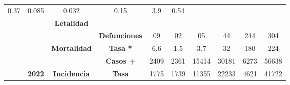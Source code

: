 \begin{tabular}{lccc|cccccc|}
		\multicolumn{1}{c|}{\cellcolor[HTML]{E2EFDA}0.37} &
		\multicolumn{1}{c|}{\cellcolor[HTML]{E2EFDA}0.085} &
		\multicolumn{1}{c|}{\cellcolor[HTML]{E2EFDA}0.032} &
		\multicolumn{1}{c|}{\cellcolor[HTML]{E2EFDA}0.15} &
		\multicolumn{1}{c|}{\cellcolor[HTML]{E2EFDA}3.9} &
		\cellcolor[HTML]{E2EFDA}0.54 \\ \cline{4-10} 
		\multicolumn{1}{l|}{} &
		\multicolumn{1}{c|}{\cellcolor[HTML]{E2EFDA}} &
		\multicolumn{1}{c|}{\multirow{-2}{*}{\cellcolor[HTML]{E2EFDA}\textbf{Letalidad}}} &
		\cellcolor[HTML]{E2EFDA} &
		\multicolumn{1}{c|}{\cellcolor[HTML]{E2EFDA}} &
		\multicolumn{1}{c|}{\cellcolor[HTML]{E2EFDA}} &
		\multicolumn{1}{c|}{\cellcolor[HTML]{E2EFDA}} &
		\multicolumn{1}{c|}{\cellcolor[HTML]{E2EFDA}} &
		\multicolumn{1}{c|}{\cellcolor[HTML]{E2EFDA}} &
		\cellcolor[HTML]{E2EFDA} \\ \cline{3-3}
		\multicolumn{1}{l|}{} &
		\multicolumn{1}{c|}{\cellcolor[HTML]{E2EFDA}} &
		\multicolumn{1}{c|}{\cellcolor[HTML]{E2EFDA}} &
		\multirow{-2}{*}{\cellcolor[HTML]{E2EFDA}\textbf{Defunciones}} &
		\multicolumn{1}{c|}{\multirow{-2}{*}{\cellcolor[HTML]{E2EFDA}09}} &
		\multicolumn{1}{c|}{\multirow{-2}{*}{\cellcolor[HTML]{E2EFDA}02}} &
		\multicolumn{1}{c|}{\multirow{-2}{*}{\cellcolor[HTML]{E2EFDA}05}} &
		\multicolumn{1}{c|}{\multirow{-2}{*}{\cellcolor[HTML]{E2EFDA}44}} &
		\multicolumn{1}{c|}{\multirow{-2}{*}{\cellcolor[HTML]{E2EFDA}244}} &
		\multirow{-2}{*}{\cellcolor[HTML]{E2EFDA}304} \\ \cline{4-10} 
		\multicolumn{1}{l|}{} &
		\multicolumn{1}{c|}{\cellcolor[HTML]{E2EFDA}} &
		\multicolumn{1}{c|}{\multirow{-2}{*}{\cellcolor[HTML]{E2EFDA}\textbf{Mortalidad}}} &
		\cellcolor[HTML]{E2EFDA}\textbf{Tasa *} &
		\multicolumn{1}{c|}{\cellcolor[HTML]{E2EFDA}6.6} &
		\multicolumn{1}{c|}{\cellcolor[HTML]{E2EFDA}1.5} &
		\multicolumn{1}{c|}{\cellcolor[HTML]{E2EFDA}3.7} &
		\multicolumn{1}{c|}{\cellcolor[HTML]{E2EFDA}32} &
		\multicolumn{1}{c|}{\cellcolor[HTML]{E2EFDA}180} &
		\cellcolor[HTML]{E2EFDA}224 \\ \cline{3-10} 
		\multicolumn{1}{l|}{} &
		\multicolumn{1}{c|}{\cellcolor[HTML]{E2EFDA}} &     
		\multicolumn{1}{c|}{\cellcolor[HTML]{E2EFDA}} &
		\cellcolor[HTML]{E2EFDA}\textbf{Casos +} &
		\multicolumn{1}{c|}{\cellcolor[HTML]{E2EFDA}2409} &
		\multicolumn{1}{c|}{\cellcolor[HTML]{E2EFDA}2361} &
		\multicolumn{1}{c|}{\cellcolor[HTML]{E2EFDA}15414} &
		\multicolumn{1}{c|}{\cellcolor[HTML]{E2EFDA}30181} &
		\multicolumn{1}{c|}{\cellcolor[HTML]{E2EFDA}6273} &
		\cellcolor[HTML]{E2EFDA}56638 \\ \cline{4-10} 
		\multicolumn{1}{l|}{} &
		\multicolumn{1}{c|}{\multirow{-6}{*}{\cellcolor[HTML]{E2EFDA}\textbf{2022}}} &
		\multicolumn{1}{c|}{\multirow{-2}{*}{\cellcolor[HTML]{E2EFDA}\textbf{Incidencia}}} &
		\cellcolor[HTML]{E2EFDA}\textbf{Tasa} &
		\multicolumn{1}{c|}{\cellcolor[HTML]{E2EFDA}1775} &
		\multicolumn{1}{c|}{\cellcolor[HTML]{E2EFDA}1739} &
		\multicolumn{1}{c|}{\cellcolor[HTML]{E2EFDA}11355} &
		\multicolumn{1}{c|}{\cellcolor[HTML]{E2EFDA}22233} &
		\multicolumn{1}{c|}{\cellcolor[HTML]{E2EFDA}4621} &
		\cellcolor[HTML]{E2EFDA}41722\\ \cline{2-10} 	
	\end{tabular}